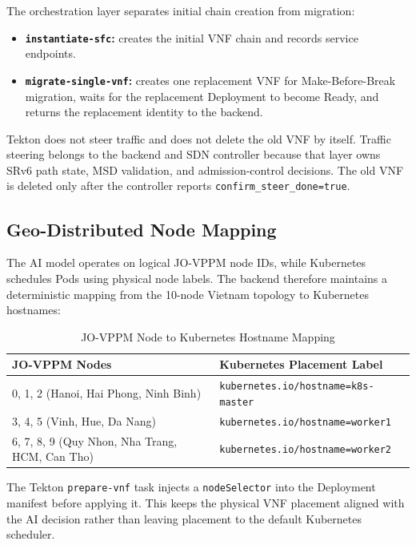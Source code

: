 \documentclass[12pt, a4paper, reqno, oneside]{book}
\begin{document}
The orchestration layer separates initial chain creation from migration:
\begin{itemize}
    \item \textbf{\texttt{instantiate-sfc}:} creates the initial VNF chain and records service endpoints.
    \item \textbf{\texttt{migrate-single-vnf}:} creates one replacement VNF for Make-Before-Break migration, waits for the replacement Deployment to become Ready, and returns the replacement identity to the backend.
\end{itemize}

Tekton does not steer traffic and does not delete the old VNF by itself. Traffic steering belongs to the backend and SDN controller because that layer owns SRv6 path state, MSD validation, and admission-control decisions. The old VNF is deleted only after the controller reports \texttt{confirm\_steer\_done=true}.

\subsection{Geo-Distributed Node Mapping}
The AI model operates on logical JO-VPPM node IDs, while Kubernetes schedules Pods using physical node labels. The backend therefore maintains a deterministic mapping from the 10-node Vietnam topology to Kubernetes hostnames:

\begin{table}[H]
\centering
\caption{JO-VPPM Node to Kubernetes Hostname Mapping}
\label{table:ai_k8s_mapping}
\begin{tabular}{ll}
\toprule
\textbf{JO-VPPM Nodes} & \textbf{Kubernetes Placement Label} \\
\midrule
0, 1, 2 (Hanoi, Hai Phong, Ninh Binh) & \texttt{kubernetes.io/hostname=k8s-master} \\
3, 4, 5 (Vinh, Hue, Da Nang) & \texttt{kubernetes.io/hostname=worker1} \\
6, 7, 8, 9 (Quy Nhon, Nha Trang, HCM, Can Tho) & \texttt{kubernetes.io/hostname=worker2} \\
\bottomrule
\end{tabular}
\end{table}

The Tekton \texttt{prepare-vnf} task injects a \texttt{nodeSelector} into the Deployment manifest before applying it. This keeps the physical VNF placement aligned with the AI decision rather than leaving placement to the default Kubernetes scheduler.
\end{document}
